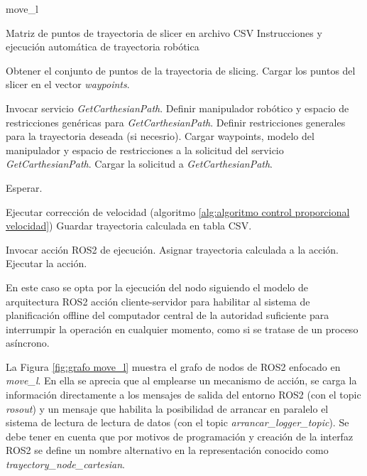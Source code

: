 \begin{algorithm}[h!]
\caption{move\_l}\label{alg:algoritmo move l}
\begin{algorithmic}[1]
\Require Matriz de puntos de trayectoria de slicer en archivo CSV
\Ensure Instrucciones y ejecución automática de trayectoria robótica

\State Obtener el conjunto de puntos de la trayectoria de slicing.
\State Cargar los puntos del slicer en el vector \textit{waypoints}.

\State Invocar servicio \textit{GetCarthesianPath}.
\State Definir manipulador robótico y espacio de restricciones genéricas para \textit{GetCarthesianPath}.
\State Definir restricciones generales para la trayectoria deseada (si necesrio).
\State Cargar waypoints, modelo del manipulador y espacio de restricciones a la solicitud del servicio \textit{GetCarthesianPath}.
\State Cargar la solicitud a \textit{GetCarthesianPath}.

    \State Esperar.
\EndWhile

    \State Ejecutar corrección de velocidad (algoritmo \ref{alg:algoritmo control proporcional velocidad})
\EndIf
\State Guardar trayectoria calculada en tabla CSV.

\State Invocar acción ROS2 de ejecución.
\State Asignar trayectoria calculada a la acción.
\State Ejecutar la acción.

\end{algorithmic}
\end{algorithm}

En este caso se opta por la ejecución del nodo siguiendo el modelo de arquitectura ROS2 acción cliente-servidor para habilitar al sistema de planificación offline del computador central de la autoridad suficiente para interrumpir la operación en cualquier momento, como si se tratase de un proceso asíncrono. 

La Figura \ref{fig:grafo move_l} muestra el grafo de nodos de ROS2 enfocado en \textit{move\_l}. En ella se aprecia que al emplearse un mecanismo de acción, se carga la información directamente a los mensajes de salida del entorno ROS2 (con el topic \textit{rosout}) y un mensaje que habilita la posibilidad de arrancar en paralelo el sistema de lectura de lectura de datos (con el topic \textit{arrancar\_logger\_topic}). Se debe tener en cuenta que por motivos de programación y creación de la interfaz ROS2 se define un nombre alternativo en la representación conocido como \textit{trayectory\_node\_cartesian}.

